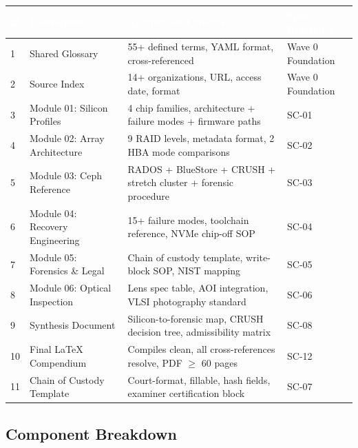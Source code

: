 \documentclass[11pt,letterpaper]{article}
\newcommand{\tableheader}[1]{\textbf{\sffamily\textcolor{white}{#1}}}
\begin{document}
\begin{center}
\begin{tabularx}{\textwidth}{C{0.4cm}L{3cm}L{3cm}X}
\toprule
{}
\tableheader{\#} & \tableheader{Deliverable} & \tableheader{Acceptance Criteria} & \tableheader{Spec Reference} \\
 & Shared Glossary & 55+ defined terms, YAML format, cross-referenced & Wave 0 Foundation \\
2 & Source Index & 14+ organizations, URL, access date, format & Wave 0 Foundation \\
3 & Module 01: Silicon Profiles & 4 chip families, architecture + failure modes + firmware paths & SC-01 \\
4 & Module 02: Array Architecture & 9 RAID levels, metadata format, 2 HBA mode comparisons & SC-02 \\
5 & Module 03: Ceph Reference & RADOS + BlueStore + CRUSH + stretch cluster + forensic procedure & SC-03 \\
6 & Module 04: Recovery Engineering & 15+ failure modes, toolchain reference, NVMe chip-off SOP & SC-04 \\
7 & Module 05: Forensics \& Legal & Chain of custody template, write-block SOP, NIST mapping & SC-05 \\
8 & Module 06: Optical Inspection & Lens spec table, AOI integration, VLSI photography standard & SC-06 \\
9 & Synthesis Document & Silicon-to-forensic map, CRUSH decision tree, admissibility matrix & SC-08 \\
10 & Final LaTeX Compendium & Compiles clean, all cross-references resolve, PDF $\geq$ 60 pages & SC-12 \\
11 & Chain of Custody Template & Court-format, fillable, hash fields, examiner certification block & SC-07 \\
\bottomrule
\end{tabularx}
\end{center}

\subsection{Component Breakdown}
\end{document}
